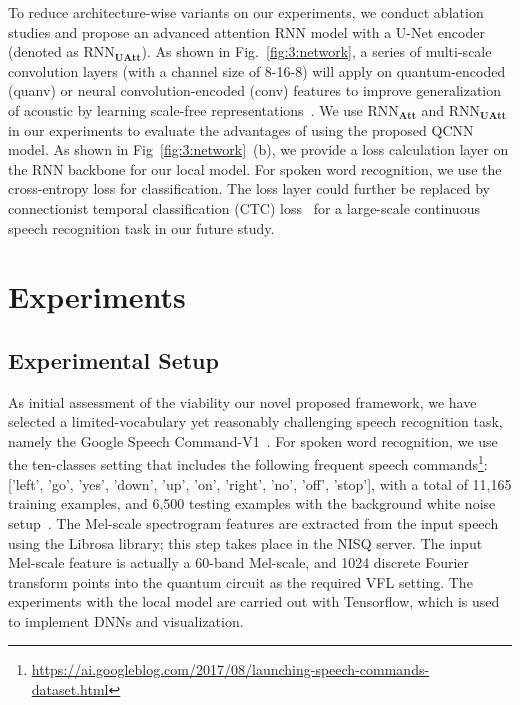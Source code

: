 \documentclass{article}
\begin{document}
To reduce architecture-wise variants on our experiments, we conduct ablation studies and propose an advanced attention RNN model with a U-Net encoder~\cite{yang2020characterizing} (denoted as RNN$_\mathbf{UAtt}$). As shown in Fig.~\ref{fig:3:network}, a series of multi-scale convolution layers (with a channel size of 8-16-8) will apply on quantum-encoded (quanv) or neural convolution-encoded (conv) features to improve generalization of acoustic by learning scale-free representations~\cite{yang2020characterizing}. We use RNN$_\mathbf{Att}$ and RNN$_\mathbf{UAtt}$ in our experiments to evaluate the advantages of using the proposed QCNN model. As shown in Fig~\ref{fig:3:network}~(b), we provide a loss calculation layer on the RNN backbone for our local model. For spoken word recognition, we use the cross-entropy loss for classification. The loss layer could further be replaced by connectionist temporal classification (CTC) loss~\cite{graves2006connectionist} for a large-scale continuous speech recognition task in our future study.


\section{Experiments}
\label{sec:exp}
\subsection{Experimental Setup}
As initial assessment of the  viability our novel proposed framework, we have selected a limited-vocabulary yet reasonably challenging speech recognition task, namely the Google Speech Command-V1~\cite{warden2018speech}. For spoken word recognition, we use the ten-classes setting that includes the following frequent speech commands\footnote{ \href{https://ai.googleblog.com/2017/08/launching-speech-commands-dataset.html}{https://ai.googleblog.com/2017/08/launching-speech-commands-dataset.html}}: ['left', 'go', 'yes', 'down', 'up', 'on', 'right', 'no', 'off', 'stop'], with a total of 11,165 training examples, and 6,500 testing examples with the background white noise setup~\cite{warden2018speech}. 
The Mel-scale spectrogram features are extracted from the input speech using the Librosa library; this step takes place in the NISQ server. The input Mel-scale feature is actually a 60-band Mel-scale, and 1024 discrete Fourier transform points into the quantum circuit as the required VFL setting. The experiments with the local model are carried out with Tensorflow, which is used  to implement DNNs and visualization.
\end{document}
